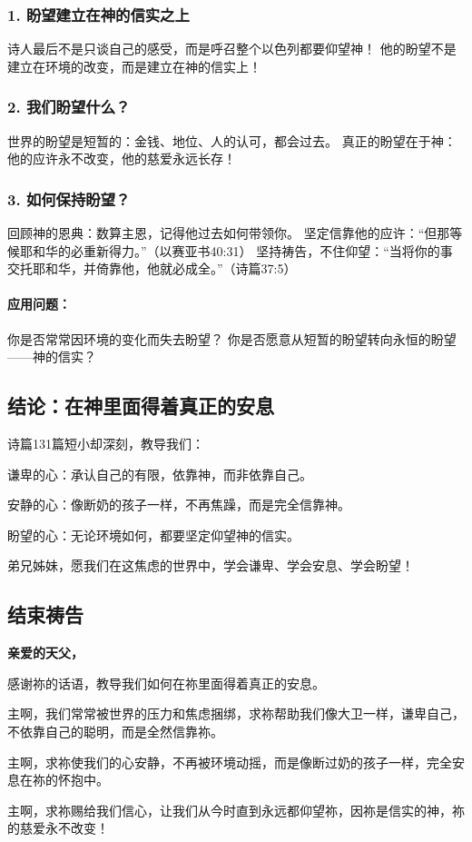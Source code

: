 \documentclass[a4paper, 12pt]{article}
\begin{document}
\subsubsection*{1. 盼望建立在神的信实之上}
诗人最后不是只谈自己的感受，而是呼召整个以色列都要仰望神！
他的盼望不是建立在环境的改变，而是建立在神的信实上！
\subsubsection*{2. 我们盼望什么？}
世界的盼望是短暂的：金钱、地位、人的认可，都会过去。
真正的盼望在于神：他的应许永不改变，他的慈爱永远长存！
\subsubsection*{3. 如何保持盼望？}
回顾神的恩典：数算主恩，记得他过去如何带领你。
坚定信靠他的应许：“但那等候耶和华的必重新得力。”（以赛亚书40:31）
坚持祷告，不住仰望：“当将你的事交托耶和华，并倚靠他，他就必成全。”（诗篇37:5）
\paragraph*{应用问题：}

你是否常常因环境的变化而失去盼望？
你是否愿意从短暂的盼望转向永恒的盼望——神的信实？
\subsection*{结论：在神里面得着真正的安息}
诗篇131篇短小却深刻，教导我们：

谦卑的心：承认自己的有限，依靠神，而非依靠自己。

安静的心：像断奶的孩子一样，不再焦躁，而是完全信靠神。

盼望的心：无论环境如何，都要坚定仰望神的信实。

弟兄姊妹，愿我们在这焦虑的世界中，学会谦卑、学会安息、学会盼望！

\subsection*{结束祷告}
\textbf{亲爱的天父，}

感谢祢的话语，教导我们如何在祢里面得着真正的安息。

主啊，我们常常被世界的压力和焦虑捆绑，求祢帮助我们像大卫一样，谦卑自己，不依靠自己的聪明，而是全然信靠祢。

主啊，求祢使我们的心安静，不再被环境动摇，而是像断过奶的孩子一样，完全安息在祢的怀抱中。

主啊，求祢赐给我们信心，让我们从今时直到永远都仰望祢，因祢是信实的神，祢的慈爱永不改变！
\end{document}
